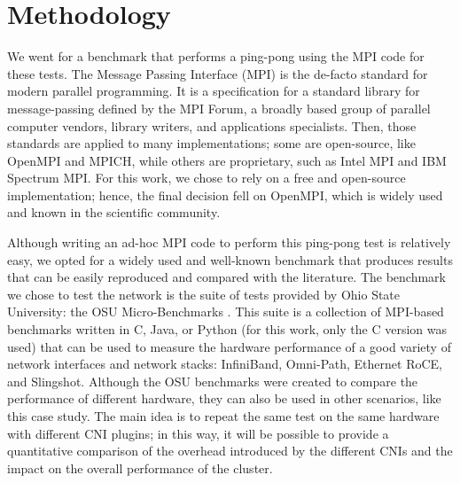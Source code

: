 \section{Methodology}\label{sec:methodology}

We went for a benchmark that performs a ping-pong using the MPI code for these
tests. The Message Passing Interface (MPI) \cite{mpi41} is the de-facto standard
for modern parallel programming. It is a specification for a standard library
for message-passing defined by the MPI Forum, a broadly based group of parallel
computer vendors, library writers, and applications specialists. Then, those
standards are applied to many implementations; some are open-source, like
OpenMPI and MPICH, while others are proprietary, such as Intel MPI and IBM
Spectrum MPI. For this work, we chose to rely on a free and open-source
implementation; hence, the final decision fell on OpenMPI, which is widely used
and known in the scientific community.

Although writing an ad-hoc MPI code to perform this ping-pong test is relatively
easy, we opted for a widely used and well-known benchmark that produces results
that can be easily reproduced and compared with the literature. The benchmark we
chose to test the network is the suite of tests provided by Ohio State
University: the OSU Micro-Benchmarks \cite{osu}. This suite is a collection of
MPI-based benchmarks written in C, Java, or Python (for this work, only the C
version was used) that can be used to measure the hardware performance of a good
variety of network interfaces and network stacks: InfiniBand, Omni-Path,
Ethernet RoCE, and Slingshot. Although the OSU benchmarks were created to
compare the performance of different hardware, they can also be used in other
scenarios, like this case study. The main idea is to repeat the same test on the
same hardware with different CNI plugins; in this way, it will be possible to
provide a quantitative comparison of the overhead introduced by the different
CNIs and the impact on the overall performance of the cluster.


